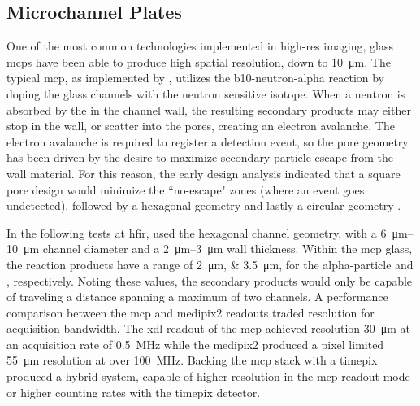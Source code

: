 \documentclass[../../../main.tex]{subfiles}
\begin{document}
%
    \subsection{Microchannel Plates}%
    \label{sec:chapter-2:advanced-detectors:microchannel-plates}%
    One of the most common technologies implemented in \gls{high-res} imaging, glass \glspl{mcp} have been able to produce high spatial resolution, down to \Xmath{\sim}\SI{10}{\micro\meter}.
    The typical \gls{mcp}, as implemented by \citeauthor*{Tremsin_2005}, utilizes the \gls{b10-neutron-alpha} reaction by doping the glass channels with the neutron sensitive isotope.
    When a neutron is absorbed by the  in the channel wall, the resulting secondary products may either stop in the wall, or scatter into the pores, creating an electron avalanche.
    The electron avalanche is required to register a detection event, so the pore geometry has been driven by the desire to maximize secondary particle escape from the wall material.
    For this reason, the early design analysis indicated that a square pore design would minimize the ``no-escape" zones (where an event goes undetected), followed by a hexagonal geometry and lastly a circular geometry \cite{Tremsin_2005}.
    \par%
    In the following tests at \gls{hfir}, \citeauthor*{Tremsin_2008} used the hexagonal channel geometry, with a \SIrange{6}{10}{\micro\meter} channel diameter and a \SIrange{2}{3}{\micro\meter} wall thickness. 
    Within the \gls{mcp} glass, the reaction products have a range of \SIlist[list-units={repeat}]{2;3.5}{\micro\meter}, for the \gls{alpha-particle} and , respectively.
    Noting these values, the secondary products would only be capable of traveling a distance spanning a maximum of two channels.
    A performance comparison between the \gls{mcp} and \gls{medipix2} readouts traded resolution for acquisition bandwidth.
    The \gls{xdl} readout of the \gls{mcp} achieved resolution \Xmath{\sim}\SI{30}{\micro\meter} at an acquisition rate of \SI{0.5}{\mega\hertz} while the \gls{medipix2} produced a pixel limited \SI{55}{\micro\meter} resolution at over \SI{100}{\mega\hertz}.
    Backing the \gls{mcp} stack with a \gls{timepix} produced a hybrid system, capable of higher resolution in the \gls{mcp} readout mode or higher counting rates with the \gls{timepix} detector.
\end{document}
